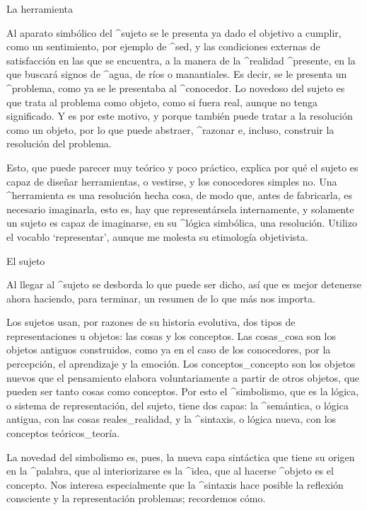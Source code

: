 \Section La herramienta

Al aparato simbólico del ^{sujeto} se le presenta ya dado el objetivo a
cumplir, como un sentimiento, por ejemplo de ^{sed}, y las condiciones
externas de satisfacción en las que se encuentra, a la manera de la
^{realidad} ^{presente}, en la que buscará signos de ^{agua}, de ríos o
manantiales. Es decir, se le presenta un ^{problema}, como ya se le
presentaba al ^{conocedor}. Lo novedoso del sujeto es que trata al
problema como objeto, como si fuera real, aunque no tenga significado. Y
es por este motivo, y porque también puede tratar a la resolución como
un objeto, por lo que puede abstraer, ^{razonar} e, incluso, construir
la resolución del problema.

Esto, que puede parecer muy teórico y poco práctico, explica por qué el
sujeto es capaz de diseñar herramientas, o vestirse, y los conocedores
simples no. Una ^{herramienta} es una resolución hecha cosa, de modo
que, antes de fabricarla, es necesario imaginarla, esto es, hay que
representársela internamente, y solamente un sujeto es capaz de
imaginarse, en su ^{lógica simbólica}, una resolución. Utilizo el
vocablo `representar', aunque me molesta su etimología objetivista.


\Section El sujeto

Al llegar al ^{sujeto} se desborda lo que puede ser dicho, así que es
mejor detenerse ahora haciendo, para terminar, un resumen de lo que más
nos importa.

Los sujetos usan, por razones de su historia evolutiva, dos tipos de
representaciones u objetos: las cosas y los conceptos. Las cosas_{cosa}
son los objetos antiguos construidos, como ya en el caso de los
conocedores, por la percepción, el aprendizaje y la emoción. Los
conceptos_{concepto} son los objetos nuevos que el pensamiento elabora
voluntariamente a partir de otros objetos, que pueden ser tanto cosas
como conceptos. Por esto el ^{simbolismo}, que es la lógica, o sistema
de representación, del sujeto, tiene dos capas: la ^{semántica}, o
lógica antigua, con las cosas reales_{realidad}, y la ^{sintaxis}, o
lógica nueva, con los conceptos teóricos_{teoría}.

La novedad del simbolismo es, pues, la nueva capa sintáctica que tiene
su origen en la ^{palabra}, que al interiorizarse es la ^{idea}, que al
hacerse ^{objeto} es el concepto. Nos interesa especialmente que la
^{sintaxis} hace posible la reflexión consciente y la representación
problemas; recordemos cómo.

